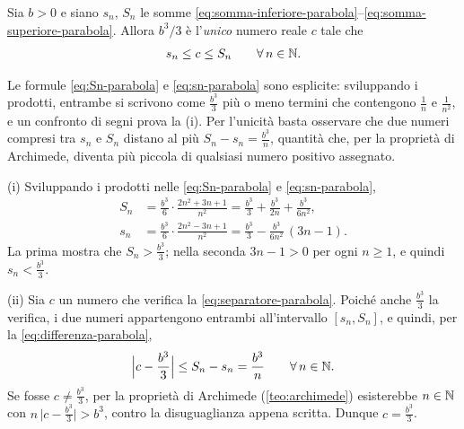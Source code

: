 \begin{proposizione}\label{prop:settore-parabola}
Sia $b>0$ e siano $s_{n}$, $S_{n}$ le somme
\eqref{eq:somma-inferiore-parabola}--\eqref{eq:somma-superiore-parabola}. Allora
$b^{3}/3$ è l'\emph{unico} numero reale $c$ tale che
\begin{equation}\label{eq:separatore-parabola}
  s_{n}\le c\le S_{n} \qquad\forall\, n\in\mathbb{N} .
\end{equation}
\end{proposizione}

\begin{schema}
\end{schema}

\begin{strategia}
Le formule \eqref{eq:Sn-parabola} e \eqref{eq:sn-parabola} sono esplicite: sviluppando i
prodotti, entrambe si scrivono come $\frac{b^{3}}3$ più o meno termini che contengono
$\frac1n$ e $\frac1{n^{2}}$, e un confronto di segni prova la (i). Per l'unicità basta
osservare che due numeri compresi tra $s_{n}$ e $S_{n}$ distano al più
$S_{n}-s_{n}=\frac{b^{3}}n$, quantità che, per la proprietà di Archimede, diventa più
piccola di qualsiasi numero positivo assegnato.
\end{strategia}

\begin{dimostrazione}
(i) Sviluppando i prodotti nelle \eqref{eq:Sn-parabola} e \eqref{eq:sn-parabola},
\[
\begin{aligned}
  S_{n}&=\frac{b^{3}}6\cdot\frac{2n^{2}+3n+1}{n^{2}}
  =\frac{b^{3}}3+\frac{b^{3}}{2n}+\frac{b^{3}}{6n^{2}},\\
  s_{n}&=\frac{b^{3}}6\cdot\frac{2n^{2}-3n+1}{n^{2}}
  =\frac{b^{3}}3-\frac{b^{3}}{6n^{2}}\,(3n-1) .
\end{aligned}
\]
La prima mostra che $S_{n}>\frac{b^{3}}3$; nella seconda $3n-1>0$ per ogni $n\ge1$, e
quindi $s_{n}<\frac{b^{3}}3$.

(ii) Sia $c$ un numero che verifica la \eqref{eq:separatore-parabola}. Poiché anche
$\frac{b^{3}}3$ la verifica, i due numeri appartengono entrambi all'intervallo
$[s_{n},S_{n}]$, e quindi, per la \eqref{eq:differenza-parabola},
\[
  \Bigl|c-\frac{b^{3}}3\Bigr|\le S_{n}-s_{n}=\frac{b^{3}}n \qquad\forall\, n\in\mathbb{N} .
\]
Se fosse $c\neq\frac{b^{3}}3$, per la proprietà di Archimede (\cref{teo:archimede})
esisterebbe $n\in\mathbb{N}$ con $n\,\bigl|c-\frac{b^{3}}3\bigr|>b^{3}$, contro la disuguaglianza
appena scritta. Dunque $c=\frac{b^{3}}3$.
\end{dimostrazione}

